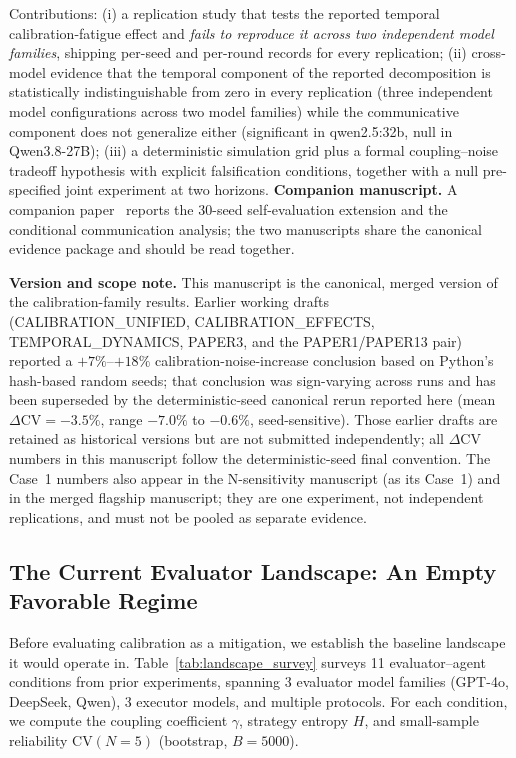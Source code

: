 \documentclass[11pt]{article}
\newcommand{\CV}{\ensuremath{\mathrm{CV}}}
\theoremstyle{definition}
\theoremstyle{remark}
\begin{document}
\noindent Contributions: (i) a replication study that tests the reported temporal calibration-fatigue effect and \emph{fails to reproduce it across two independent model families}, shipping per-seed and per-round records for every replication; (ii) cross-model evidence that the temporal component of the reported decomposition is statistically indistinguishable from zero in every replication (three independent model configurations across two model families) while the communicative component does not generalize either (significant in qwen2.5:32b, null in Qwen3.8-27B); (iii) a deterministic simulation grid plus a formal coupling--noise tradeoff hypothesis with explicit falsification conditions, together with a null pre-specified joint experiment at two horizons. \textbf{Companion manuscript.} A companion paper~\citep{companion2026} reports the 30-seed self-evaluation extension and the conditional communication analysis; the two manuscripts share the canonical evidence package and should be read together.

\textbf{Version and scope note.} This manuscript is the canonical, merged version of the calibration-family results. Earlier working drafts (CALIBRATION\_UNIFIED, CALIBRATION\_EFFECTS, TEMPORAL\_DYNAMICS, PAPER3, and the PAPER1/PAPER13 pair) reported a $+7\%$--$+18\%$ calibration-noise-increase conclusion based on Python's hash-based random seeds; that conclusion was sign-varying across runs and has been superseded by the deterministic-seed canonical rerun reported here (mean $\Delta\CV = -3.5\%$, range $-7.0\%$ to $-0.6\%$, seed-sensitive). Those earlier drafts are retained as historical versions but are not submitted independently; all $\Delta\CV$ numbers in this manuscript follow the deterministic-seed final convention. The Case~1 numbers also appear in the N-sensitivity manuscript (as its Case~1) and in the merged flagship manuscript; they are one experiment, not independent replications, and must not be pooled as separate evidence.

\subsection{The Current Evaluator Landscape: An Empty Favorable Regime}

Before evaluating calibration as a mitigation, we establish the baseline landscape it would operate in. Table~\ref{tab:landscape_survey} surveys 11 evaluator--agent conditions from prior experiments, spanning 3 evaluator model families (GPT-4o, DeepSeek, Qwen), 3 executor models, and multiple protocols. For each condition, we compute the coupling coefficient $\gamma$, strategy entropy $H$, and small-sample reliability $\CV(N{=}5)$ (bootstrap, $B{=}5000$).
\end{document}

